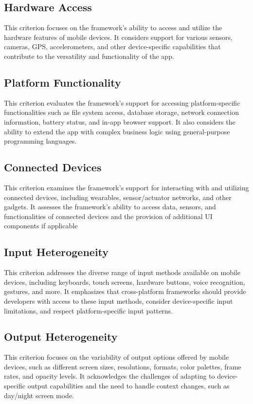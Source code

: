 \subsection{Hardware Access}
This criterion focuses on the framework's ability to access and utilize the hardware features of mobile devices. It considers support for various sensors, cameras, GPS, accelerometers, and other device-specific capabilities that contribute to the versatility and functionality of the app.

\subsection{Platform Functionality}
This criterion evaluates the framework's support for accessing platform-specific functionalities such as file system access, database storage, network connection information, battery status, and in-app browser support. It also considers the ability to extend the app with complex business logic using general-purpose programming languages.

\subsection{Connected Devices}
This criterion examines the framework's support for interacting with and utilizing connected devices, including wearables, sensor/actuator networks, and other gadgets. It assesses the framework's ability to access data, sensors, and functionalities of connected devices and the provision of additional UI components if applicable

\subsection{Input Heterogeneity}
This criterion addresses the diverse range of input methods available on mobile devices, including keyboards, touch screens, hardware buttons, voice recognition, gestures, and more. It emphasizes that cross-platform frameworks should provide developers with access to these input methods, consider device-specific input limitations, and respect platform-specific input patterns.

\subsection{Output Heterogeneity}
This criterion focuses on the variability of output options offered by mobile devices, such as different screen sizes, resolutions, formats, color palettes, frame rates, and opacity levels. It acknowledges the challenges of adapting to device-specific output capabilities and the need to handle context changes, such as day/night screen mode.

